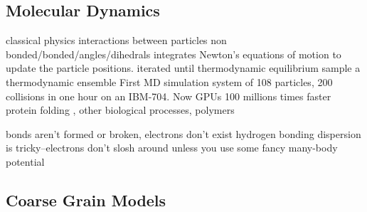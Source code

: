 \subsection*{Molecular Dynamics}
classical physics
interactions between particles
non bonded/bonded/angles/dihedrals
integrates Newton's equations of motion to update the particle positions.
iterated until thermodynamic equilibrium
sample a thermodynamic ensemble
First MD simulation system of 108 particles, 200 collisions in one hour on an IBM-704\cite{Alder1957}.
Now GPUs 100 millions times faster
protein folding \cite{levitt75}, other biological processes, polymers \cite{Gartner2019a}


bonds aren't formed or broken, electrons don't exist
hydrogen bonding
dispersion is tricky--electrons don't slosh around unless you use some fancy many-body potential

\subsection*{Coarse Grain Models}


